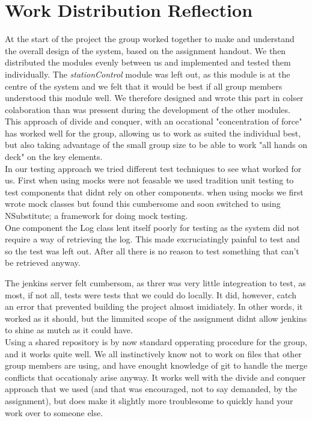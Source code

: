 \section{Work Distribution Reflection}

At the start of the project the group worked together to make and understand the overall design of the system, based on the assignment handout. We then distributed the modules evenly between us and implemented and tested them individually. 
The \textit{stationControl} module was left out, as this module is at the centre of the system and we felt that it would be best if all group members understood this module well. We therefore designed and wrote this part in colser colaboration than was pressent during the development of the other modules.\\

This approach of divide and conquer, with an occational "concentration of force" has worked well for the group, allowing us to work as suited the individual best, but also taking advantage of the small group size to be able to work "all hands on deck" on the key elements.\\

In our testing approach we tried different test techniques to see what worked for us. 
First when using mocks were not feasable we used tradition unit testing to test components that didnt rely on other components.
when using mocks we first wrote mock classes but found this cumbersome and soon switched to using NSubstitute; a framework for 
doing mock testing. \\

One component the Log class lent itself poorly for testing as the system did not require a way of retrieving the log. This made
excruciatingly painful to test and so the test was left out.
After all there is no reason to test something that can't be retrieved anyway.

The jenkins server felt cumbersom, as threr was very little integreation to test, as most, if not all, tests were tests that we could do locally. It did, however, catch an error that prevented building the project almost imidiately. In other words, it worked as it should, but the limmited scope of the assignment didnt allow jenkins to shine as mutch as it could have.\\

Using a shared repository is by now standard opperating procedure for the group, and it works quite well. We all instinctively know not to work on files that other group members are using, and have enought knowledge of git to handle the merge conflicts that occationaly arise anyway. It works well with the divide and conquer approach that we used (and that was encouraged, not to say demanded, by the assignment), but does make it slightly more troublesome to quickly hand your work over to someone else.


\newpage
